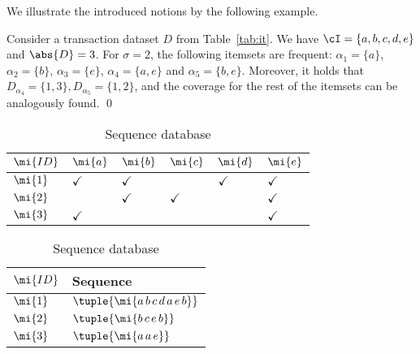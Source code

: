 We illustrate the introduced notions by the following example.

\begin{example}\label{ex:it}
Consider a transaction dataset $D$ from Table~\ref{tab:it}.
We have %
$\cI=\{a,b,c,d,e\}$ and $\abs{D}=3$. For $\sigma=2$, the following itemsets are frequent: $\alpha_1{=}\{a\}$, $\alpha_2{=}\{b\}$, $\alpha_3{=}\{e\}$, $\alpha_4{=}\{a,e\}$ and $\alpha_5{=}\{b,e\}$. Moreover, it holds that $D_{\alpha_4}=\{1,3\}, D_{\alpha_5}=\{1,2\}$, and the coverage for the rest of the itemsets can be analogously found. \qed
\end{example}



\begin{table}[t]
    \begin{minipage}{.5\linewidth}
      \centering
\begin{tabular}{|l|l|l|l|l|l|}
\hline
$\mi{ID}$& $\mi{a}$ &$\mi{b}$&$\mi{c}$&$\mi{d}$&$\mi{e}$\\ \hline
$\mi{1}$ & $\checkmark$ &$\checkmark$ &&$\checkmark$&$\checkmark$\\ \hline
$\mi{2}$ &  &$\checkmark$ &$\checkmark$&&$\checkmark$\\ \hline
$\mi{3}$ &$\checkmark$ &&&&$\checkmark$ \\ \hline
\end{tabular}
      \caption{Transaction database}
\label{tab:it}
    \end{minipage}%
    \begin{minipage}{.5\linewidth}
      \centering
\begin{tabular}{|l|l|}
\hline
$\mi{ID}$& Sequence\\ \hline
$\mi{1}$ & $\tuple{\mi{a\,b\,c\,d\,a\,e\,b}}$ \\ \hline
$\mi{2}$ & $\tuple{\mi{b\,c\,e\,b}}$\\ \hline
$\mi{3}$ & $\tuple{\mi{a\,a\,e}}$ \\ \hline
\end{tabular}
      \caption{Sequence database}
\label{tab:seq}

    \end{minipage} 
\label{tab:ex}
\end{table}


